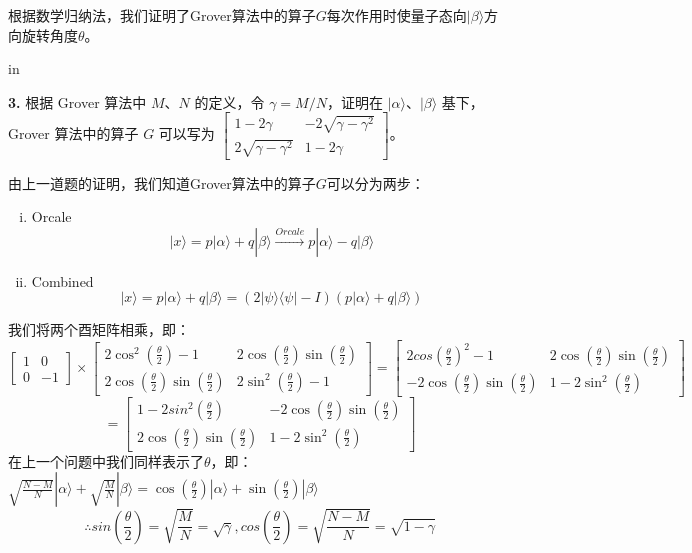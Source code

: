\documentclass[11pt]{article}
\begin{document}
根据数学归纳法，我们证明了Grover算法中的算子$G$每次作用时使量子态向$|\beta\rangle$方向旋转角度$\theta$。

 in

{\bf 3.} 根据 Grover 算法中 $M$、$N$ 的定义，令 $\gamma = M/N$，证明在 $|\alpha\rangle$、$|\beta\rangle$ 基下，Grover 算法中的算子 $G$ 可以写为 $\begin{bmatrix}
    1-2\gamma & -2\sqrt{\gamma-\gamma^2} \\ 2\sqrt{\gamma-\gamma^2} & 1-2\gamma
\end{bmatrix}$。

由上一道题的证明，我们知道Grover算法中的算子$G$可以分为两步：
\begin{enumerate}[i.]
    \item Orcale
    \[|x\rangle = p |\alpha\rangle + q |\beta\rangle \stackrel{Orcale}\longrightarrow  p |\alpha\rangle - q|\beta\rangle\]
    \item Combined
    \[|x\rangle = p |\alpha\rangle + q |\beta\rangle =  \left(2|\psi\rangle\langle\psi| - I\right) \left(p |\alpha\rangle + q |\beta\rangle \right)\]
\end{enumerate}
我们将两个酉矩阵相乘，即：
\[
\begin{bmatrix}
    1 & 0\\
    0 & -1
\end{bmatrix}
\times
\begin{bmatrix}
    2\cos^2(\frac{\theta}{2}) - 1 & 2\cos(\frac{\theta}{2})\sin(\frac{\theta}{2}) \\
    2\cos(\frac{\theta}{2})\sin(\frac{\theta}{2}) & 2\sin^2(\frac{\theta}{2}) - 1
\end{bmatrix}
=
\begin{bmatrix}
    2cos(\frac{\theta}{2})^2 - 1 & 2\cos(\frac{\theta}{2})\sin(\frac{\theta}{2}) \\
    -2\cos(\frac{\theta}{2})\sin(\frac{\theta}{2}) & 1-2\sin^2(\frac{\theta}{2})
\end{bmatrix}
\]
\[
= 
\begin{bmatrix}
    1-2sin^2(\frac{\theta}{2}) & -2\cos(\frac{\theta}{2})\sin(\frac{\theta}{2}) \\
    2\cos(\frac{\theta}{2})\sin(\frac{\theta}{2}) & 1-2\sin^2(\frac{\theta}{2})
\end{bmatrix}
\]
在上一个问题中我们同样表示了$\theta$，即：
$\sqrt{\frac{N-M}{N}}|\alpha\rangle + \sqrt{\frac{M}{N}} |\beta\rangle= \cos(\frac{\theta}{2}) |\alpha\rangle + \sin(\frac{\theta}{2}) |\beta\rangle$
\[\therefore sin(\frac{\theta}{2}) = \sqrt{\frac{M}{N}} = \sqrt{\gamma},cos(\frac{\theta}{2}) = \sqrt{\frac{N-M}{N}} = \sqrt{1-\gamma} \]
\end{document}
